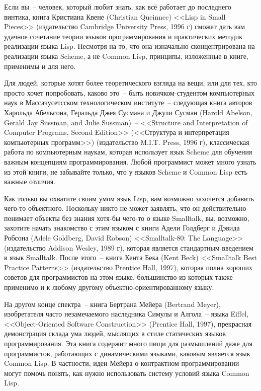 Если вы~-- человек, который любит знать, как всё работает до последнего винтика, книга
Кристиана Квене (Christian Queinnec) <<Lisp in Small Pieces>> (издательство Cambridge
University Press, 1996 г) сможет дать вам удачное сочетание теории языков программирования
и практических методик реализации языка Lisp. Несмотря на то, что она изначально
сконцентрирована на реализации языка Scheme, а не Common Lisp, принципы, изложенные в
книге, применимы и для него.

Для людей, которые хотят более теоретического взгляда на вещи, или для тех, кто просто
хочет попробовать, каково это~-- быть новичком-студентом компьютерных наук в
Массачусетсском технологическом институте~-- следующая книга авторов Харольда Абельсона,
Геральда Джея Сусмана и Джули Сусман (Harold Abelson, Gerald Jay Sussman, and Julie
Sussman)~-- <<Structure and Interpretation of Computer Programs, Second Edition>>
(<<Структура и интерпретация компьютерных программ>>) (издательство M.I.T. Press, 1996 г),
классическая работа по компьютерным наукам, которая использует язык Scheme для обучения
важным концепциям программирования. Любой программист может много узнать из этой книги, не
забывайте только, что у языков Scheme и Common Lisp есть важные отличия.

Как только вы охватите своим умом язык Lisp, вам возможно захочется добавить чего-то
объектного. Поскольку никто не может заявлять, что он действительно понимает объекты без
знания хотя-бы чего-то о языке Smalltalk, вы, возможно, захотите начать знакомство с этим
языком с книги Адели Голдберг и Дэвида Робсона (Adele Goldberg, David Robson)
<<Smalltalk-80: The Language>> (издательство Addison Wesley, 1989 г), которая является
стандартным введением в язык Smalltalk. После этого~-- книга Кента Бека (Kent Beck)
<<Smalltalk Best Practice Patterns>> (издательство Prentice Hall, 1997), которая полна
хороших советов для программистов на этом языке, большинство из которых также применимо и
к любому другому объектно-ориентированному языку.

На другом конце спектра~-- книга Бертрана Мейера (Bertrand Meyer), изобретателя часто
незамечаемого наследника Симулы и Алгола~-- языка Eiffel, <<Object-Oriented Software
Construction>> (Prentice Hall, 1997), прекрасная демонстрация склада ума людей, мыслящих в
стиле статических языков программирования. Эта книга содержит много пищи для размышлений
даже для программистов, работающих с динамическими языками, каковым является язык Common
Lisp.  В частности, идеи Мейера о контрактном программировании могут помочь понять, как
нужно использовать систему условий языка Common Lisp.

